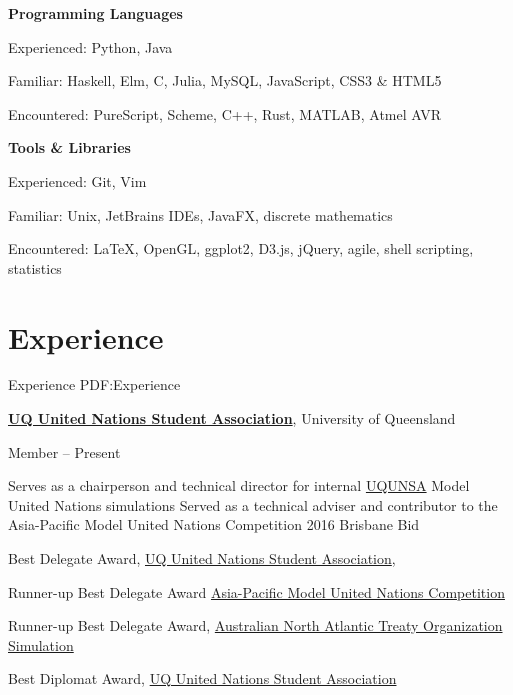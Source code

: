 \documentclass[a4paper,10pt,oneside]{article}
\begin{document}
\begin{body}
\textbf{Programming Languages}
\par Experienced: Python, Java
\par Familiar: Haskell, Elm, C, Julia, MySQL, JavaScript, CSS3 \& HTML5
\par Encountered: PureScript, Scheme, C++, Rust, MATLAB, Atmel AVR

\EntryGap

\textbf{Tools \& Libraries}
\par Experienced: Git, Vim
\par Familiar: Unix, JetBrains IDEs, JavaFX, discrete mathematics
\par Encountered: \LaTeX, OpenGL, ggplot2, D3.js, jQuery, agile, shell scripting, statistics


\section
{Experience}
{Experience}
{PDF:Experience}

\href{http://www.unsauq.org/}
{\textbf{UQ United Nations Student Association}}, University of Queensland

\par Member \hfill {} -- Present

\begin{detail}
\BulletItem Serves as a chairperson and technical director for internal \href{http://www.unsauq.org/}{UQUNSA} Model United Nations simulations 
\BulletItem Served as a technical adviser and contributor to the Asia-Pacific Model United Nations Competition 2016 Brisbane Bid
\end{detail}

\par Best Delegate Award, \href{http://www.unsauq.org/}{UQ United Nations Student Association}, \hfill {}
\par Runner-up Best Delegate Award \href{http://www.amunc.net/}{Asia-Pacific Model United Nations Competition} \hfill {}
\par Runner-up Best Delegate Award, \href{http://www.ausnatos.org/}{Australian North Atlantic Treaty Organization Simulation} \hfill {}
\par Best Diplomat Award, \href{http://www.unsauq.org/}{UQ United Nations Student Association} \hfill {}

\EntryGap


\end{body}
\end{document}

